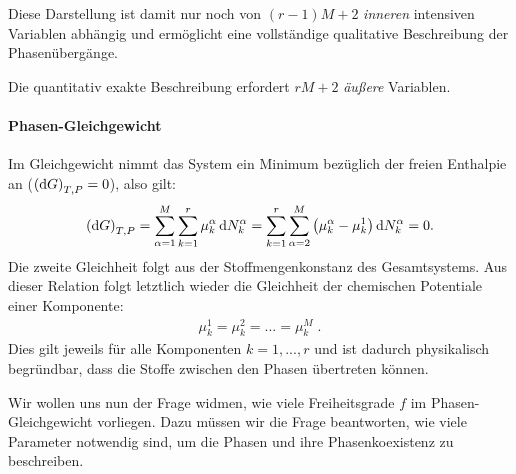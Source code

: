 Diese Darstellung ist damit nur noch von $(r-1)M+2$ \emph{inneren} intensiven Variablen abhängig und ermöglicht eine vollständige qualitative Beschreibung der Phasenübergänge.

Die quantitativ exakte Beschreibung erfordert $rM+2$ \emph{äußere} Variablen.
\paragraph*{Phasen-Gleichgewicht}
Im Gleichgewicht nimmt das System ein Minimum bezüglich der freien Enthalpie an ($\left(\mathop{}\!\mathrm{d} G\right)_{T,P}=0$), also gilt:
\begin{align*}
    \left(\mathop{}\!\mathrm{d} G\right)_{T,P}=\sum_{\alpha=1}^{M}\sum_{k=1}^{r}\mu_k^\alpha\mathop{}\!\mathrm{d} N_k^\alpha=\sum_{k=1}^{r}\sum_{\alpha=2}^{M}\left(\mu_k^\alpha-\mu_k^1\right)\mathop{}\!\mathrm{d} N_k^\alpha=0.
\end{align*} 
Die zweite Gleichheit folgt aus der Stoffmengenkonstanz des Gesamtsystems. Aus dieser Relation folgt letztlich wieder die Gleichheit der chemischen Potentiale einer Komponente:
\begin{align}
    \label{eq:chemPotGG}
    \boxed{\mu_k^1=\mu_k^2=...=\mu_k^M}\;.
\end{align}
Dies gilt jeweils für alle Komponenten $k=1,...,r$ und ist dadurch physikalisch begründbar, dass die Stoffe zwischen den Phasen übertreten können.

Wir wollen uns nun der Frage widmen, wie viele Freiheitsgrade $f$ im Phasen-Gleichgewicht vorliegen. Dazu müssen wir die Frage beantworten, wie viele Parameter notwendig sind, um die Phasen und ihre Phasenkoexistenz zu beschreiben.
